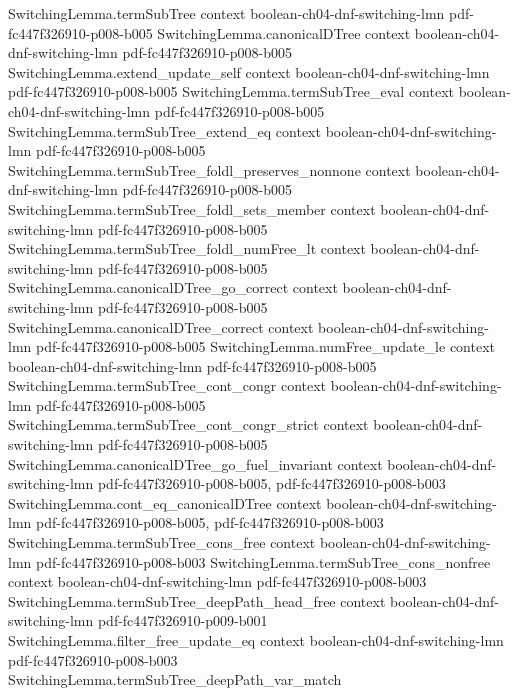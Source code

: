 \begin{theorem}
\proofstep
  {SwitchingLemma.termSubTree}
  {context}
  {boolean-ch04-dnf-switching-lmn}
  {pdf-fc447f326910-p008-b005}
\proofstep
  {SwitchingLemma.canonicalDTree}
  {context}
  {boolean-ch04-dnf-switching-lmn}
  {pdf-fc447f326910-p008-b005}
\proofstep
  {SwitchingLemma.extend_update_self}
  {context}
  {boolean-ch04-dnf-switching-lmn}
  {pdf-fc447f326910-p008-b005}
\proofstep
  {SwitchingLemma.termSubTree_eval}
  {context}
  {boolean-ch04-dnf-switching-lmn}
  {pdf-fc447f326910-p008-b005}
\proofstep
  {SwitchingLemma.termSubTree_extend_eq}
  {context}
  {boolean-ch04-dnf-switching-lmn}
  {pdf-fc447f326910-p008-b005}
\proofstep
  {SwitchingLemma.termSubTree_foldl_preserves_nonnone}
  {context}
  {boolean-ch04-dnf-switching-lmn}
  {pdf-fc447f326910-p008-b005}
\proofstep
  {SwitchingLemma.termSubTree_foldl_sets_member}
  {context}
  {boolean-ch04-dnf-switching-lmn}
  {pdf-fc447f326910-p008-b005}
\proofstep
  {SwitchingLemma.termSubTree_foldl_numFree_lt}
  {context}
  {boolean-ch04-dnf-switching-lmn}
  {pdf-fc447f326910-p008-b005}
\proofstep
  {SwitchingLemma.canonicalDTree_go_correct}
  {context}
  {boolean-ch04-dnf-switching-lmn}
  {pdf-fc447f326910-p008-b005}
\proofstep
  {SwitchingLemma.canonicalDTree_correct}
  {context}
  {boolean-ch04-dnf-switching-lmn}
  {pdf-fc447f326910-p008-b005}
\proofstep
  {SwitchingLemma.numFree_update_le}
  {context}
  {boolean-ch04-dnf-switching-lmn}
  {pdf-fc447f326910-p008-b005}
\proofstep
  {SwitchingLemma.termSubTree_cont_congr}
  {context}
  {boolean-ch04-dnf-switching-lmn}
  {pdf-fc447f326910-p008-b005}
\proofstep
  {SwitchingLemma.termSubTree_cont_congr_strict}
  {context}
  {boolean-ch04-dnf-switching-lmn}
  {pdf-fc447f326910-p008-b005}
\proofstep
  {SwitchingLemma.canonicalDTree_go_fuel_invariant}
  {context}
  {boolean-ch04-dnf-switching-lmn}
  {pdf-fc447f326910-p008-b005,
    pdf-fc447f326910-p008-b003}
\proofstep
  {SwitchingLemma.cont_eq_canonicalDTree}
  {context}
  {boolean-ch04-dnf-switching-lmn}
  {pdf-fc447f326910-p008-b005,
    pdf-fc447f326910-p008-b003}
\proofstep
  {SwitchingLemma.termSubTree_cons_free}
  {context}
  {boolean-ch04-dnf-switching-lmn}
  {pdf-fc447f326910-p008-b003}
\proofstep
  {SwitchingLemma.termSubTree_cons_nonfree}
  {context}
  {boolean-ch04-dnf-switching-lmn}
  {pdf-fc447f326910-p008-b003}
\proofstep
  {SwitchingLemma.termSubTree_deepPath_head_free}
  {context}
  {boolean-ch04-dnf-switching-lmn}
  {pdf-fc447f326910-p009-b001}
\proofstep
  {SwitchingLemma.filter_free_update_eq}
  {context}
  {boolean-ch04-dnf-switching-lmn}
  {pdf-fc447f326910-p008-b003}
\proofstep
  {SwitchingLemma.termSubTree_deepPath_var_match}

\end{theorem}
